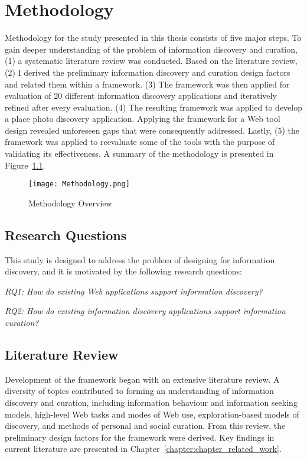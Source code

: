 \chapter{Methodology}
\label{chapter:methodology}

Methodology for the study presented in this thesis consists of five major steps. To gain deeper understanding of the problem of information discovery and curation, (1) a systematic literature review was conducted. Based on the literature review, (2) I derived the preliminary information discovery and curation design factors and related them within a framework. (3) The framework was then applied for evaluation of 20 different information discovery applications and iteratively refined after every evaluation. (4) The resulting framework was applied to develop a place photo discovery application. Applying the framework for a Web tool design revealed unforeseen gaps that were consequently addressed. Lastly, (5) the framework was applied to reevaluate some of the tools with the purpose of validating its effectiveness.  A summary of the methodology is presented in Figure~\ref{fig:methodology}.
\\

\begin{figure}[ht!]
	\noindent
	\centering
	\texttt{[image: Methodology.png]}
	\caption{Methodology Overview}
	\label{fig:methodology} 
\end{figure}

{\section{Research Questions}
This study is designed to address the problem of designing for information discovery, and it is motivated by the following research questions:

\emph{RQ1: How do existing Web applications support information discovery?}

\emph{RQ2: How do existing information discovery applications support information curation?}
}%

{\section{Literature Review}
Development of the framework began with an extensive literature review. A diversity of topics contributed to forming an understanding of information discovery and curation, including information behaviour and information seeking models, high-level Web tasks and modes of Web use, exploration-based models of discovery, and methods of personal and social curation. From this review, the preliminary design factors for the framework were derived. Key findings in current literature are presented in Chapter~\ref{chapter:chapter_related_work}.
}%

